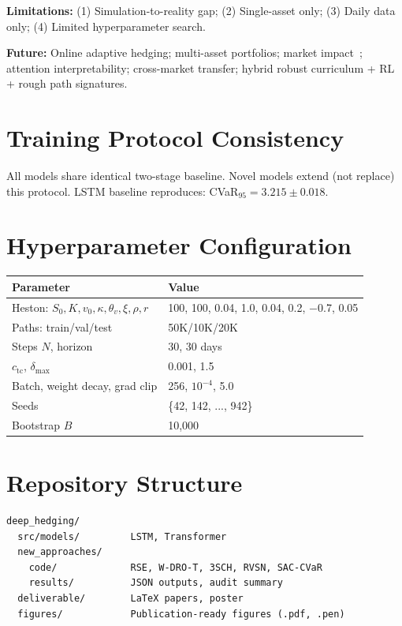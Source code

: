 \documentclass[11pt]{article}
\begin{document}
\textbf{Limitations:} (1) Simulation-to-reality gap; (2) Single-asset only; (3) Daily data only; (4) Limited hyperparameter search.

\textbf{Future:} Online adaptive hedging; multi-asset portfolios; market impact~\citep{pickard2025rl}; attention interpretability; cross-market transfer; hybrid robust curriculum + RL + rough path signatures.

\appendix
\section{Training Protocol Consistency}
All models share identical two-stage baseline. Novel models extend (not replace) this protocol. LSTM baseline reproduces: CVaR$_{95} = 3.215 \pm 0.018$.

\section{Hyperparameter Configuration}
\begin{table}[H]\centering\small
\begin{tabular}{@{}ll@{}}
\toprule
\textbf{Parameter} & \textbf{Value} \\\midrule
Heston: $S_0, K, v_0, \kappa, \theta_v, \xi, \rho, r$ & 100, 100, 0.04, 1.0, 0.04, 0.2, $-$0.7, 0.05 \\
Paths: train/val/test & 50K/10K/20K \\
Steps $N$, horizon & 30, 30 days \\
$c_{\mathrm{tc}}$, $\delta_{\max}$ & 0.001, 1.5 \\
Batch, weight decay, grad clip & 256, $10^{-4}$, 5.0 \\
Seeds & \{42, 142, ..., 942\} \\
Bootstrap $B$ & 10,000 \\
\bottomrule
\end{tabular}
\end{table}

\section{Repository Structure}
\begin{verbatim}
deep_hedging/
  src/models/         LSTM, Transformer
  new_approaches/
    code/             RSE, W-DRO-T, 3SCH, RVSN, SAC-CVaR
    results/          JSON outputs, audit summary
  deliverable/        LaTeX papers, poster
  figures/            Publication-ready figures (.pdf, .pen)
\end{verbatim}
\end{document}
